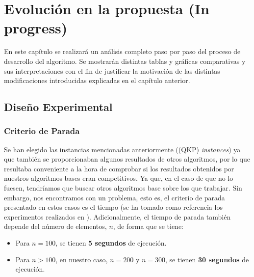 \chapter{Evolución en la propuesta \color{red}(In progress)\color{black}}

En este capítulo se realizará un análisis completo paso por paso del proceso de desarrollo del algoritmo. 
Se mostrarán distintas tablas y gráficas comparativas y sus interpretaciones con el fin de justificar la motivación de las distintas modificaciones introducidas explicadas en el capítulo anterior.

\section{Diseño Experimental}
\subsection{Criterio de Parada}

Se han elegido las instancias mencionadas anteriormente (\href{http://cedric.cnam.fr/~soutif/QKP/QKP.html}{(QKP) \textit{instances}}) ya que también se proporcionaban algunos resultados de otros algoritmos, por lo que resultaba conveniente a la hora de comprobar si los resultados obtenidos por nuestros algoritmos bases eran competitivos. 
Ya que, en el caso de que no lo fuesen, tendríamos que buscar otros algoritmos base sobre los que trabajar.
Sin embargo, nos encontramos con un problema, esto es, el criterio de parada presentado en estos casos es el tiempo (se ha tomado como referencia los experimentos realizados en \parencite{garcia-martinezStrategicOscillationQuadratic2014}).
Adicionalmente, el tiempo de parada también depende del número de elementos, $n$, de forma que se tiene:
\begin{itemize}
\item Para $n = 100$, se tienen \textbf{5 segundos} de ejecución.
\item Para $n > 100$, en nuestro caso, $n = 200$ y $n = 300$, se tienen \textbf{30 segundos} de ejecución.
\end{itemize}

